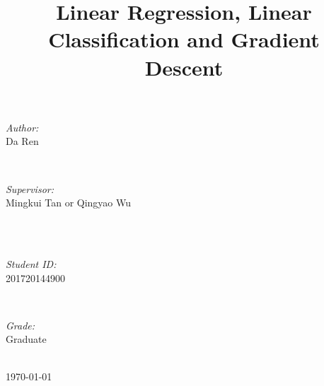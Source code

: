 \documentclass[journal, a4paper]{IEEEtran}
\begin{document}
\begin{titlepage}
\begin{minipage}{0.4\textwidth}
\begin{flushleft} \large
\emph{Author:}\\
Da Ren %
\end{flushleft}
\end{minipage}
~
\begin{minipage}{0.4\textwidth}
\begin{flushright} \large
\emph{Supervisor:} \\
Mingkui Tan or Qingyao Wu %
\end{flushright}
\end{minipage}\\[2cm]
~
\begin{minipage}{0.4\textwidth}
\begin{flushleft} \large
\emph{Student ID:}\\
201720144900
\end{flushleft}
\end{minipage}
~
\begin{minipage}{0.4\textwidth}
\begin{flushright} \large
\emph{Grade:} \\
Graduate
\end{flushright}
\end{minipage}\\[2cm]



{\large \today}\\[2cm] %



\vfill %

\end{titlepage}

	\title{Linear Regression, Linear Classification and Gradient Descent}
	\maketitle
\end{document}
